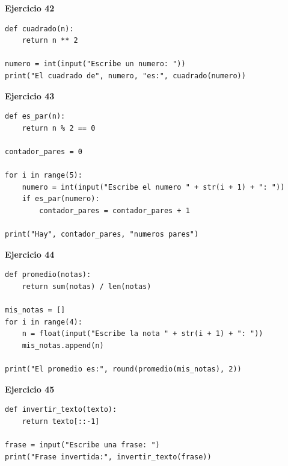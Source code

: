 \documentclass[12pt,a4paper]{article}
\begin{document}
\begin{cajaSolucion}
\textbf{Ejercicio 42}
\begin{lstlisting}[style=pythonStyle]
def cuadrado(n):
    return n ** 2

numero = int(input("Escribe un numero: "))
print("El cuadrado de", numero, "es:", cuadrado(numero))
\end{lstlisting}
\end{cajaSolucion}

\begin{cajaSolucion}
\textbf{Ejercicio 43}
\begin{lstlisting}[style=pythonStyle]
def es_par(n):
    return n % 2 == 0

contador_pares = 0

for i in range(5):
    numero = int(input("Escribe el numero " + str(i + 1) + ": "))
    if es_par(numero):
        contador_pares = contador_pares + 1

print("Hay", contador_pares, "numeros pares")
\end{lstlisting}
\end{cajaSolucion}

\begin{cajaSolucion}
\textbf{Ejercicio 44}
\begin{lstlisting}[style=pythonStyle]
def promedio(notas):
    return sum(notas) / len(notas)

mis_notas = []
for i in range(4):
    n = float(input("Escribe la nota " + str(i + 1) + ": "))
    mis_notas.append(n)

print("El promedio es:", round(promedio(mis_notas), 2))
\end{lstlisting}
\end{cajaSolucion}

\begin{cajaSolucion}
\textbf{Ejercicio 45}
\begin{lstlisting}[style=pythonStyle]
def invertir_texto(texto):
    return texto[::-1]

frase = input("Escribe una frase: ")
print("Frase invertida:", invertir_texto(frase))
\end{lstlisting}
\end{cajaSolucion}
\end{document}

